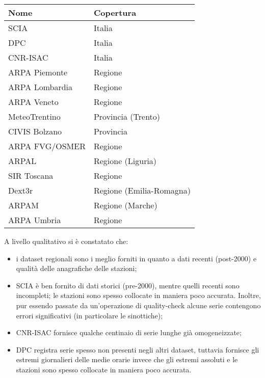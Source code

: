 \begin{table}[ht]
  \centering
  \begin{tabular}{l l}
    \toprule
    Nome & Copertura \\
    \midrule
    SCIA & Italia \\
    DPC & Italia \\
    CNR-ISAC & Italia \\
    ARPA Piemonte & Regione \\
    ARPA Lombardia & Regione \\
    ARPA Veneto & Regione \\
    MeteoTrentino & Provincia (Trento) \\
    CIVIS Bolzano & Provincia \\
    ARPA FVG/OSMER & Regione \\
    ARPAL & Regione (Liguria) \\
    SIR Toscana & Regione \\
    Dext3r & Regione (Emilia-Romagna) \\
    ARPAM & Regione (Marche) \\
    ARPA Umbria & Regione \\
    \bottomrule
  \end{tabular}
\end{table}

A livello qualitativo si è constatato che:

\begin{itemize}
  \item
    i dataset regionali sono i meglio forniti in quanto a dati recenti (post-2000) e qualità delle anagrafiche delle stazioni;
  \item
    SCIA è ben fornito di dati storici (pre-2000), mentre quelli recenti sono incompleti; le stazioni sono spesso collocate in maniera poco accurata. Inoltre, pur essendo passate da un'operazione di quality-check alcune serie contengono errori significativi (in particolare le sinottiche);
  \item
    CNR-ISAC fornisce qualche centinaio di serie lunghe già omogeneizzate;
  \item
    DPC registra serie spesso non presenti negli altri dataset, tuttavia fornisce gli estremi giornalieri delle medie orarie invece che gli estremi assoluti e le stazioni sono spesso collocate in maniera poco accurata.
\end{itemize}

